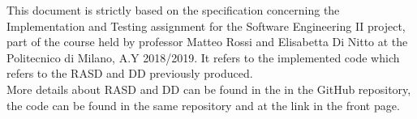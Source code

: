 This document is strictly based on the specification concerning the Implementation and Testing assignment for the Software Engineering II project, part of the course held by professor Matteo Rossi and Elisabetta Di Nitto at the Politecnico di Milano, A.Y 2018/2019. It refers to the implemented code which refers to the RASD and DD previously produced.\\ More details about RASD and DD can be found in the in the GitHub repository, the code can be found in the same repository and at the link in the front page.